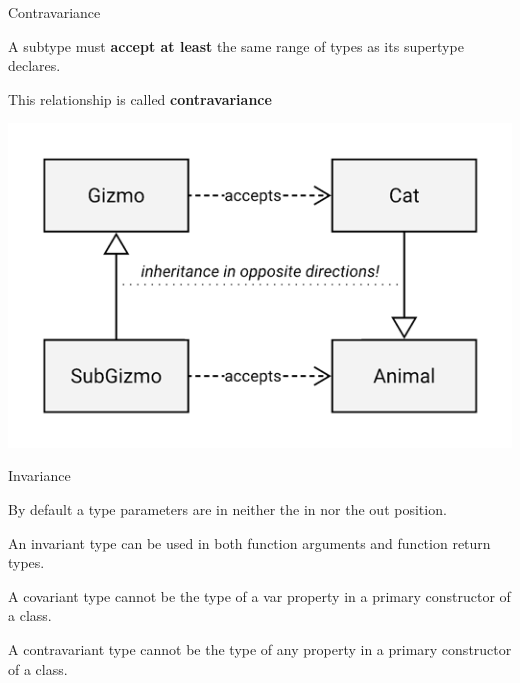 \documentclass[xcolor=pdftex,dvipsnames,table]{beamer}
\newenvironment{bgverbatim}[1]{
  \vspace{5pt}#1\VerbatimEnvironment
  \begin{tcolorbox}[breakable,spartan]%
  \begin{Verbatim}[commandchars=&\[\]]}
  {\end{Verbatim}\end{tcolorbox}}
\newenvironment{wideitemize}{\itemize\addtolength{\itemsep}{5pt}}{\enditemize}
\begin{document}
\begin{frame}{Contravariance}
  \begin{wideitemize}
    \item A subtype must \textbf{accept at least} the same range of types as its supertype declares.
    \item This relationship is called \textbf{contravariance}
  \end{wideitemize}
  \begin{center}
    \includegraphics[height=0.5\textheight,keepaspectratio]{images/contravariant-argument-types}
  \end{center}
\end{frame}


\begin{frame}{Invariance}
  \begin{wideitemize}
    \item By default a type parameters are in neither the in nor the out position.
    \item An invariant type can be used in both function arguments and function return types.
    \item A covariant type cannot be the type of a var property in a primary constructor of a class.
    \item A contravariant type cannot be the type of any property in a primary constructor of a class.
  \end{wideitemize}
\end{frame}
\end{document}
